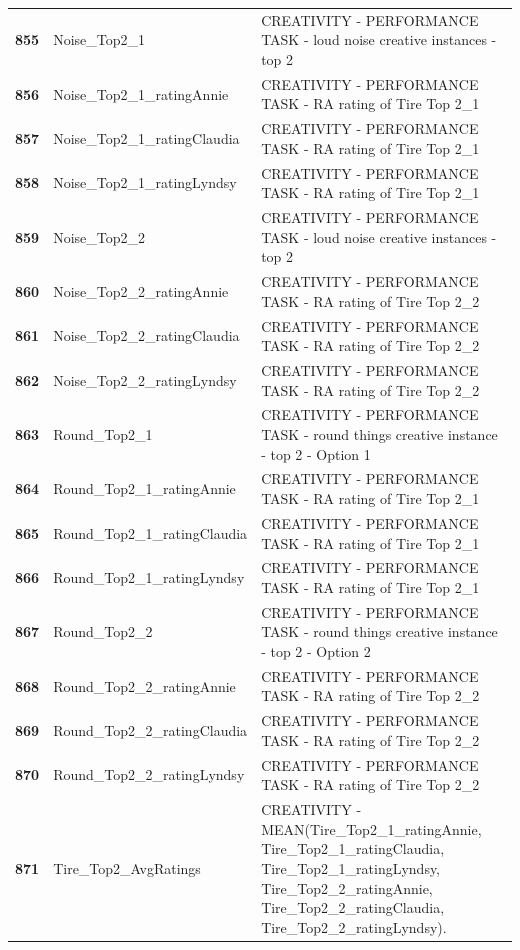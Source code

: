 \documentclass[
  letterpaper,
  DIV=11,
  numbers=noendperiod]{scrartcl}
\begin{document}
\begin{longtable}[t]{>{}cll}
\textbf{855} & Noise\_Top2\_1 & CREATIVITY - PERFORMANCE TASK - loud noise creative instances - top 2\\
\addlinespace
\textbf{856} & Noise\_Top2\_1\_ratingAnnie & CREATIVITY - PERFORMANCE TASK - RA rating of Tire Top 2\_1\\
\textbf{857} & Noise\_Top2\_1\_ratingClaudia & CREATIVITY - PERFORMANCE TASK - RA rating of Tire Top 2\_1\\
\textbf{858} & Noise\_Top2\_1\_ratingLyndsy & CREATIVITY - PERFORMANCE TASK - RA rating of Tire Top 2\_1\\
\textbf{859} & Noise\_Top2\_2 & CREATIVITY - PERFORMANCE TASK - loud noise creative instances - top 2\\
\textbf{860} & Noise\_Top2\_2\_ratingAnnie & CREATIVITY - PERFORMANCE TASK - RA rating of Tire Top 2\_2\\
\addlinespace
\textbf{861} & Noise\_Top2\_2\_ratingClaudia & CREATIVITY - PERFORMANCE TASK - RA rating of Tire Top 2\_2\\
\textbf{862} & Noise\_Top2\_2\_ratingLyndsy & CREATIVITY - PERFORMANCE TASK - RA rating of Tire Top 2\_2\\
\textbf{863} & Round\_Top2\_1 & CREATIVITY - PERFORMANCE TASK - round things creative instance - top 2 - Option 1\\
\textbf{864} & Round\_Top2\_1\_ratingAnnie & CREATIVITY - PERFORMANCE TASK - RA rating of Tire Top 2\_1\\
\textbf{865} & Round\_Top2\_1\_ratingClaudia & CREATIVITY - PERFORMANCE TASK - RA rating of Tire Top 2\_1\\
\addlinespace
\textbf{866} & Round\_Top2\_1\_ratingLyndsy & CREATIVITY - PERFORMANCE TASK - RA rating of Tire Top 2\_1\\
\textbf{867} & Round\_Top2\_2 & CREATIVITY - PERFORMANCE TASK - round things creative instance - top 2 - Option 2\\
\textbf{868} & Round\_Top2\_2\_ratingAnnie & CREATIVITY - PERFORMANCE TASK - RA rating of Tire Top 2\_2\\
\textbf{869} & Round\_Top2\_2\_ratingClaudia & CREATIVITY - PERFORMANCE TASK - RA rating of Tire Top 2\_2\\
\textbf{870} & Round\_Top2\_2\_ratingLyndsy & CREATIVITY - PERFORMANCE TASK - RA rating of Tire Top 2\_2\\
\addlinespace
\textbf{871} & Tire\_Top2\_AvgRatings & CREATIVITY - MEAN(Tire\_Top2\_1\_ratingAnnie, Tire\_Top2\_1\_ratingClaudia, Tire\_Top2\_1\_ratingLyndsy,  Tire\_Top2\_2\_ratingAnnie, Tire\_Top2\_2\_ratingClaudia,  Tire\_Top2\_2\_ratingLyndsy).\\

\end{longtable}
\end{document}
